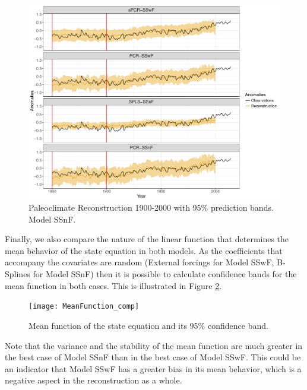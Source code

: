 \documentclass[11pt]{amsart}
\theoremstyle{plain}
\theoremstyle{definition}
\theoremstyle{remark}
\begin{document}
\begin{figure}
  \centering
  \includegraphics[scale=0.45]{Rec1900_Final}
  \caption{Paleoclimate Reconstruction 1900-2000 with 95\%
    prediction bands. Model SSnF.}
  \label{fig:paleo19001}
\end{figure}

Finally, we also compare the nature of the linear function that determines the
mean behavior of the state equation in both models. As the coefficients that
accompany the covariates are random (External forcings for Model SSwF, B-Splines
for Model SSnF) then it is possible to calculate confidence bands for the mean
function in both cases. This is illustrated in Figure \ref{fig:meanfunction}.
\begin{figure}
  \centering
  \texttt{[image: MeanFunction\_comp]}
  \caption{Mean function of the state equation and its 95\% confidence band.}
  \label{fig:meanfunction}
\end{figure}
Note that the variance and the stability of the mean function are much greater
in the best case of Model SSnF than in the best case of Model SSwF. This could be an
indicator that Model SSwF has a greater bias in its mean behavior, which is a
negative aspect in the reconstruction as a whole.
\end{document}
